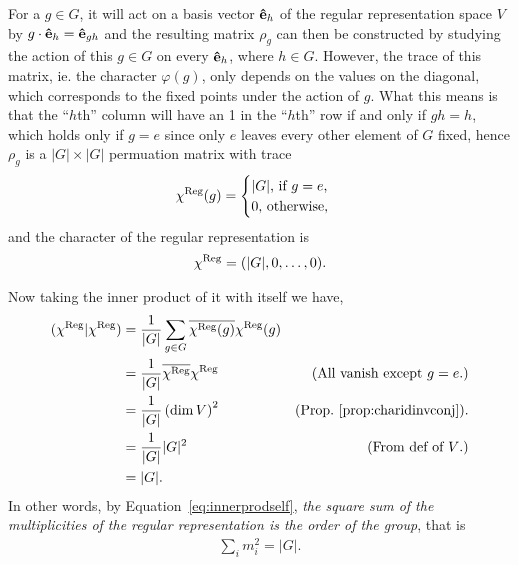 For a $g \in G$, it will act on a basis vector $\mathbf{\hat{e}}_h$ of the regular representation space $V$ by $g \cdot \mathbf{\hat{e}}_{h} = \mathbf{\hat{e}}_{gh}$ and the resulting matrix $\rho_g$ can then be constructed by studying the action of this $g \in G$ on every $\mathbf{\hat{e}}_h$, where $h \in G$. However, the trace of this matrix, ie. the character $\varphi(g)$, only depends on the values on the diagonal, which corresponds to the fixed points under the action of $g$. What this means is that the ``$h$th'' column will have an 1 in the ``$h$th'' row if and only if $gh = h$, which holds only if $g = e$ since only $e$ leaves every other element of $G$ fixed, hence $\rho_g$ is a $|G| \times |G|$ permuation matrix with trace
\begin{align*}
	\chi^{\text{Reg}}(g) = \begin{cases}
		|G| \text{, if $g = e$,} \\
		0 \text{, otherwise,}
	\end{cases}
\end{align*}
and the character of the regular representation is 
\begin{align*}
	\chi^{\text{Reg}} = (|G|, 0, \dots, 0).
\end{align*}

Now taking the inner product of it with itself we have,
\begin{align*}
	(\chi^{\text{Reg}}|\chi^{\text{Reg}}) &= \frac{1}{|G|} \sum_{g \in G} \overline{\chi^{\text{Reg}}(g)}\chi^{\text{Reg}}(g) \\
	&=  \frac{1}{|G|}  \overline{\chi^{\text{Reg}}}\chi^{\text{Reg}} & \text{(All vanish except $g=e$.)} \\
	&= \frac{1}{|G|} \left(\dim V \right)^2  & \text{(Prop.~\ref{prop:charidinvconj}).}\\
	&= \frac{1}{|G|}|G|^2 & \text{(From def of $V$.)} \\
	&= |G|.
\end{align*}
In other words, by Equation~\ref{eq:innerprodself}, \textit{the square sum of the multiplicities of the regular representation is the order of the group}, that is
\begin{align}\label{eq:sqsummult}
	\sum_i m_i^2 = |G|.
\end{align}

